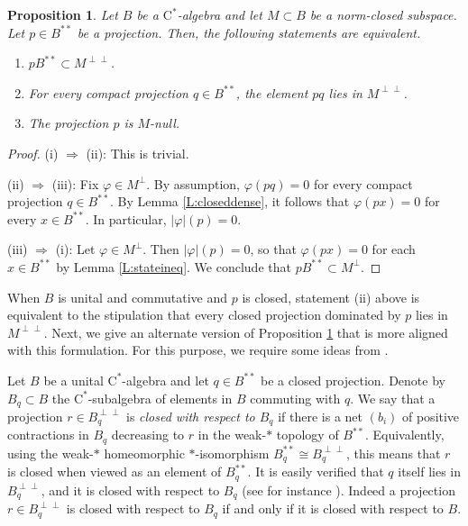 \documentclass[10pt]{amsart}
\newcommand{\rC}{\mathrm{C}}
\renewcommand{\phi}{\varphi}
\newtheorem{proposition}[lemma]{Proposition}
\theoremstyle{definition}
\begin{document}
\begin{proposition}\label{P:nullproj} 
Let $B$ be a $\rC^*$-algebra and let $M\subset B$ be a norm-closed subspace. Let $p\in B^{**}$ be a projection. Then, the following statements are equivalent. 
\begin{enumerate}[{\rm (i)}] 
\item $pB^{**}\subset M^{\perp\perp}$. 

\item For every compact projection $q\in B^{**}$, the element $pq$ lies in $M^{\perp\perp}$. 

\item The projection $p$ is $M$-null. 
\end{enumerate} 
\end{proposition} 
\begin{proof} 
(i) $\Rightarrow$ (ii): This is trivial. 

(ii) $\Rightarrow$ (iii): Fix $\phi\in M^\perp$. By assumption,  $\phi(pq)=0$ for every compact projection $q\in B^{**}$. By Lemma \ref{L:closeddense}, it follows that $\phi(px)=0$ for every $x\in B^{**}$. In particular, $|\phi|(p)=0$. 


(iii) $\Rightarrow$ (i): Let $\phi\in M^\perp$. 
Then $|\phi|(p)=0$, so that $\phi(px)=0$ for each $x\in B^{**}$ by Lemma \ref{L:stateineq}.  We conclude that $pB^{**}\subset M^\perp$. 
\end{proof} 


When $B$ is unital and commutative and $p$ is closed, statement (ii) above is equivalent to the stipulation that every closed projection dominated by $p$ lies in $M^{\perp\perp}$. Next, we give an alternate version of Proposition \ref{P:nullproj} that is more aligned with this formulation. For this purpose, we require some ideas from \cite{blecher2022}.
  

 Let $B$ be a unital $\rC^*$-algebra and let $q\in B^{**}$ be a closed projection. Denote by $B_q\subset B$ the $\rC^*$-subalgebra of elements in $B$ commuting with $q$. We say that a projection $r\in B_q^{\perp\perp}$ is \emph{closed with respect to $B_q$} if there is a net $(b_i)$ of positive contractions in $B_q$ decreasing to $r$ in the weak-$*$ topology of $B^{**}$. 
 Equivalently, using the weak-$*$ homeomorphic $*$-isomorphism $B_q^{**}\cong B_q^{\perp\perp}$,  this means that $r$ is closed when viewed as an element of $B_q^{**}$.  It is easily verified that $q$ itself lies in $B_q^{\perp\perp}$, and it is closed with respect to $B_q$ (see for instance \cite[Lemma 2.1]{blecher2022}).
 Indeed a projection $r\in B_q^{\perp\perp}$ is closed with respect to $B_q$ if and only if it is closed with respect to $B$. 
 
\end{document}
